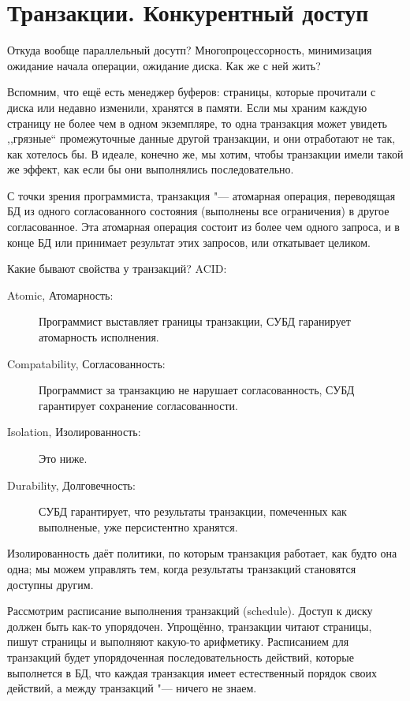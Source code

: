 \chapter{Транзакции. Конкурентный доступ}

Откуда вообще параллельный досутп?
Многопроцессорность, минимизация ожидание начала операции, ожидание диска.
Как же с ней жить?

Вспомним, что ещё есть менеджер буферов: страницы, которые прочитали с диска или недавно изменили, хранятся в памяти.
Если мы храним каждую страницу не более чем в одном экземпляре,
то одна транзакция может увидеть ,,грязные`` промежуточные данные другой транзакции, и они отработают не так, как хотелось бы.
В идеале, конечно же, мы хотим, чтобы транзакции имели такой же эффект, как если бы они выполнялись последовательно.

С точки зрения программиста, транзакция "--- атомарная операция,
переводящая БД из одного согласованного состояния (выполнены все ограничения) в другое согласованное.
Эта атомарная операция состоит из более чем одного запроса, и в конце БД или принимает результат этих запросов, или откатывает целиком.

Какие бывают свойства у транзакций? ACID:
\begin{description}
	\item[Atomic, Атомарность:] Программист выставляет границы транзакции, СУБД гаранирует атомарность исполнения.
	\item[Compatability, Согласованность:] Программист за транзакцию не нарушает согласованность, СУБД гарантирует сохранение согласованности.
	\item[Isolation, Изолированность:] Это ниже.
	\item[Durability, Долговечность:] СУБД гарантирует, что результаты транзакции, помеченных как выполненые, уже персистентно хранятся.
\end{description}

Изолированность даёт политики, по которым транзакция работает, как будто она одна;
мы можем управлять тем, когда результаты транзакций становятся доступны другим.

Рассмотрим расписание выполнения транзакций (schedule).
Доступ к диску должен быть как-то упорядочен.
Упрощённо, транзакции читают страницы, пишут страницы и выполняют какую-то арифметику.
Расписанием для транзакций будет упорядоченная последовательность действий, которые выполнется в БД,
что каждая транзакция имеет естественный порядок своих действий, а между транзакций "--- ничего не знаем.

